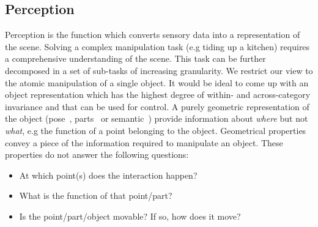 \subsection{Perception}
Perception is the function which converts sensory data into a representation of the scene. Solving a complex manipulation task (e.g tiding up a kitchen) requires a comprehensive understanding of the scene. This task can be further decomposed in a set of sub-tasks of increasing granularity. We restrict our view to the atomic manipulation of a single object. It would be ideal to come up with an object representation which has the highest degree of within- and across-category invariance and that can be used for control. A purely geometric representation of the object (pose~\cite{xiang2017posecnn}, parts~\cite{li2020category} or semantic~\cite{jang2017end}) provide information about \emph{where} but not \emph{what}, e.g the function of a point belonging to the object. Geometrical properties convey a piece of the information required to manipulate an object. These properties do not answer the following questions:
\begin{itemize}
\item At which point(s) does the interaction happen?
\item What is the function of that point/part?
\item Is the point/part/object movable? If so, how does it move?
\end{itemize}     
